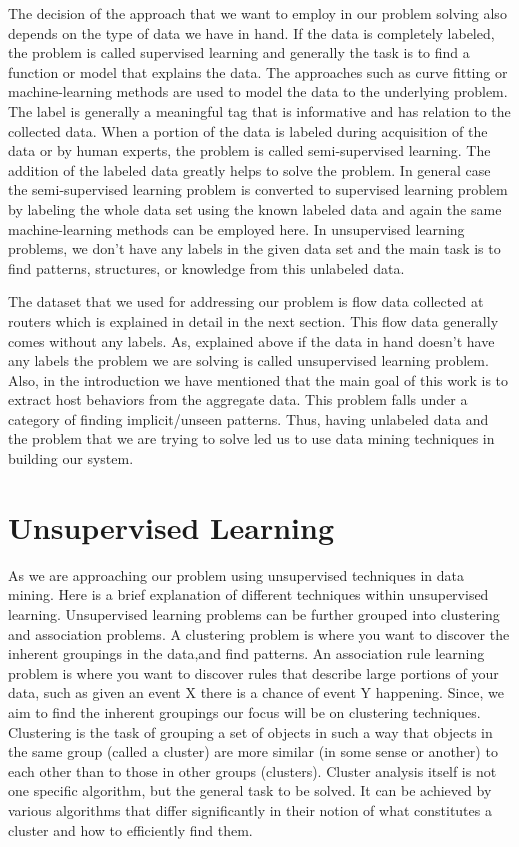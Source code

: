The decision of the approach that we want to employ in our problem solving also depends on the type of data we have in hand. If the data is completely labeled, the problem is called supervised learning and generally the task is to find a function or model that explains the data. The approaches such as curve fitting or machine-learning methods are used to model the data to the underlying problem. The label is generally a meaningful tag that is informative and has relation to the collected data.  When a portion of the data is labeled during acquisition of the data or by human experts, the problem is called semi-supervised learning. The addition of the labeled data greatly helps to solve the problem. In general case the semi-supervised learning problem is converted to supervised learning problem by labeling the whole data set using the known labeled data and again the same machine-learning methods can be employed here. In unsupervised learning problems, we don't have any labels in the given data set and the main task is to find patterns, structures, or knowledge from this unlabeled data.   

The dataset that we used for addressing our problem is flow data collected at routers which is explained in detail in the next section. This flow data generally comes without any labels. As, explained above if the data in hand doesn't have any labels the problem we are solving is called unsupervised learning problem. Also, in the introduction we have mentioned that the main goal of this work is to extract host behaviors from the aggregate data. This problem falls under a category of finding implicit/unseen patterns. Thus, having unlabeled data and the problem that we are trying to solve led us to use data mining techniques in building our system.

\section{Unsupervised Learning}  \label{unsupervised}
As we are approaching our problem using unsupervised techniques in data mining. Here is a brief explanation of different techniques within unsupervised learning.
Unsupervised learning problems can be further grouped into clustering and association problems. A clustering problem is where you want to discover the inherent groupings in the data,and find patterns. An association rule learning problem is where you want to discover rules that describe large portions of your data, such as given an event X there is a chance of event Y happening. Since, we aim to find the inherent groupings our focus will be on clustering techniques. Clustering is the task of grouping a set of objects in such a way that objects in the same group (called a cluster) are more similar (in some sense or another) to each other than to those in other groups (clusters). Cluster analysis itself is not one specific algorithm, but the general task to be solved. It can be achieved by various algorithms that differ significantly in their notion of what constitutes a cluster and how to efficiently find them.

